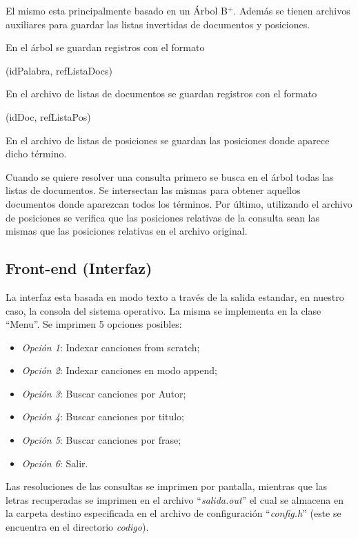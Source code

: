 \documentclass{article}
\begin{document}
	El mismo esta principalmente basado en un Árbol B$^+$. Además se tienen archivos auxiliares para guardar las listas invertidas de documentos y posiciones.
	\par
	En el árbol se guardan registros con el formato
	\bigskip

	{\ttfamily\footnotesize
	(idPalabra, refListaDocs) \\}
	 
	En el archivo de listas de documentos se guardan registros con el formato
	\bigskip

	{\ttfamily\footnotesize
	(idDoc, refListaPos) \\}
	
	En el archivo de listas de posiciones se guardan las posiciones donde aparece dicho término.
	\par
	Cuando se quiere resolver una consulta primero se busca en el árbol todas las listas de documentos. Se intersectan las mismas para obtener aquellos documentos donde aparezcan todos los términos. Por último, utilizando el archivo de posiciones se verifica que las posiciones relativas de la consulta sean las mismas que las posiciones relativas en el archivo original.
\bigskip\bigskip




\subsection{Front-end (Interfaz)}
\medskip

	La interfaz esta basada en modo texto a través de la salida estandar, en nuestro caso, la consola del sistema operativo. La misma se implementa en la clase ``Menu''. Se imprimen 5 opciones posibles:


	\begin{itemize}
	\itemsep=5pt \topsep=0pt \partopsep=0pt \parskip=0pt \parsep=0pt

		\item \textit{Opción 1}: Indexar canciones from scratch;
		\item \textit{Opción 2}: Indexar canciones en modo append;
		\item \textit{Opción 3}: Buscar canciones por Autor;
		\item \textit{Opción 4}: Buscar canciones por titulo;
		\item \textit{Opción 5}: Buscar canciones por frase;
		\item \textit{Opción 6}: Salir.

	\end{itemize}
	\medskip


	Las resoluciones de las consultas se imprimen por pantalla, mientras que las letras recuperadas se imprimen en el archivo ``\textit{salida.out}'' el cual se almacena en la carpeta destino especificada en el archivo de configuración ``\textit{config.h}'' (este se encuentra en el directorio \textit{codigo}).
\bigskip
\end{document}
